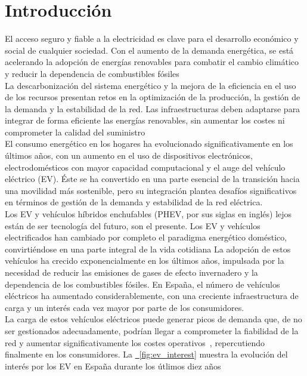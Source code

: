 \chapter{Introducción}
El acceso seguro y fiable a la electricidad es clave para el desarrollo económico y social de
cualquier sociedad. Con el aumento de la demanda energética, se está acelerando la adopción
de energías renovables para combatir el cambio climático y reducir la dependencia de
combustibles fósiles\\%

La descarbonización del sistema energético y la mejora de la eficiencia en el uso de los
recursos presentan retos en la optimización de la producción, la gestión de la demanda y la
estabilidad de la red. Las infraestructuras deben adaptarse para integrar de forma eficiente
las energías renovables, sin aumentar los costes ni comprometer la calidad del suministro\\%

El consumo energético en los hogares ha evolucionado significativamente en los últimos años,
con un aumento en el uso de dispositivos electrónicos, electrodomésticos con mayor capacidad 
computacional y el auge del vehículo eléctrico (EV). Éste se ha convertido en una parte 
esencial de la transición hacia una movilidad más sostenible, pero su integración plantea 
desafíos significativos en términos de gestión de la demanda y estabilidad de la red 
eléctrica.\\

Los EV y vehículos híbridos enchufables (PHEV, por sus siglas en inglés) lejos están de ser 
tecnología del futuro, son el presente. Los EV y vehículos electrificados han cambiado por completo
el paradigma energético doméstico, convirtiéndose en una parte integral de la vida cotidiana%
La adopción de estos vehículos ha crecido exponencialmente en los últimos años, impulsada por
la necesidad de reducir las emisiones de gases de efecto invernadero y la dependencia de los
combustibles fósiles. En España, el número de vehículos eléctricos ha aumentado considerablemente,
con una creciente infraestructura de carga y un interés cada vez mayor por parte de los
consumidores.\\  

La carga de estos vehículos eléctricos puede generar picos de demanda que, de no ser
gestionados adecuadamente, podrían llegar a comprometer la fiabilidad de la red y aumentar 
significativamente los costes operativos~\cite{yao2005energy}, repercutiendo finalmente en los consumidores.
La \hyperref[fig:ev_interest]{\figurename~\ref*{fig:ev_interest}} muestra la evolución del 
interés por los EV en España durante los útlimos diez años\\

